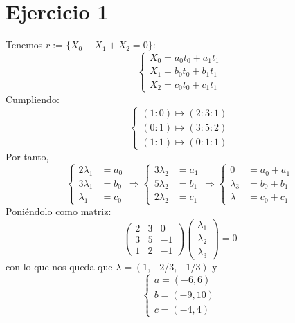 \documentclass[10pt,a4paper,openright]{book}
\theoremstyle{break}
\begin{document}
\section{Ejercicio 1}%
\label{sec:ejercicio_1_3}
Tenemos $r := \{X_0 - X_1 + X_2 = 0\}$: 
\[
\begin{cases}
    X_0 = a_0t_0 + a_1t_1\\
    X_1 = b_0t_0 + b_1t_1\\
    X_2 = c_0t_0 + c_1t_1
\end{cases} 
\]
Cumpliendo: 
\[
\begin{cases}
    \left( 1 : 0 \right) \mapsto \left( 2 : 3 : 1 \right)\\
    \left( 0 : 1 \right) \mapsto \left( 3 : 5 : 2 \right)\\
    \left( 1 : 1 \right) \mapsto \left( 0 : 1 : 1 \right) 
\end{cases} 
\]
Por tanto, 
\[
\begin{cases}
    2\lambda_1 &= a_0\\
    3\lambda_1 &= b_0\\
    \lambda_1 &= c_0
\end{cases} \Rightarrow \begin{cases}
    3\lambda_2 &= a_1\\
    5\lambda_2 &= b_1\\
    2\lambda_2 &= c_1
\end{cases} \Rightarrow \begin{cases}
    0 &= a_0 + a_1\\
    \lambda_3 &= b_0 + b_1\\
    \lambda &= c_0 + c_1
\end{cases} 
\]
Poniéndolo como matriz:
\[
    \begin{pmatrix} 2 & 3 & 0\\ 3 & 5 & -1\\ 1 & 2 & -1 \end{pmatrix} \begin{pmatrix} \lambda_1\\ \lambda_2\\ \lambda_3 \end{pmatrix} = 0 
\]
con lo que nos queda que $\lambda = \left( 1, -2/3, -1/3 \right)$ y 
\[
\begin{cases}
    a = \left( -6, 6 \right)\\
    b = \left( -9, 10 \right)\\
    c = \left( -4, 4 \right) 
\end{cases} 
\]
\end{document}
